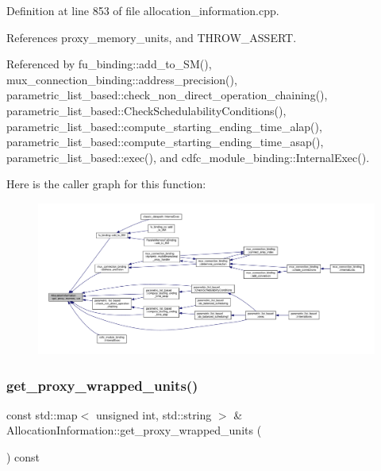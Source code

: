 Definition at line 853 of file allocation\+\_\+information.\+cpp.



References proxy\+\_\+memory\+\_\+units, and T\+H\+R\+O\+W\+\_\+\+A\+S\+S\+E\+RT.



Referenced by fu\+\_\+binding\+::add\+\_\+to\+\_\+\+S\+M(), mux\+\_\+connection\+\_\+binding\+::address\+\_\+precision(), parametric\+\_\+list\+\_\+based\+::check\+\_\+non\+\_\+direct\+\_\+operation\+\_\+chaining(), parametric\+\_\+list\+\_\+based\+::\+Check\+Schedulability\+Conditions(), parametric\+\_\+list\+\_\+based\+::compute\+\_\+starting\+\_\+ending\+\_\+time\+\_\+alap(), parametric\+\_\+list\+\_\+based\+::compute\+\_\+starting\+\_\+ending\+\_\+time\+\_\+asap(), parametric\+\_\+list\+\_\+based\+::exec(), and cdfc\+\_\+module\+\_\+binding\+::\+Internal\+Exec().

Here is the caller graph for this function\+:
\nopagebreak
\begin{figure}[H]
\begin{center}
\leavevmode
\includegraphics[width=350pt]{d7/d79/classAllocationInformation_a9e8ab22244016fcbcb7f6ef2f8934054_icgraph}
\end{center}
\end{figure}
\mbox{\label{classAllocationInformation_a60d95218cb3e60000e7a395a30442ba6}} 
\subsubsection{\texorpdfstring{get\+\_\+proxy\+\_\+wrapped\+\_\+units()}{get\_proxy\_wrapped\_units()}}
{\footnotesize\ttfamily const std\+::map$<$ unsigned int, std\+::string $>$ \& Allocation\+Information\+::get\+\_\+proxy\+\_\+wrapped\+\_\+units (\begin{DoxyParamCaption}{ }\end{DoxyParamCaption}) const}



